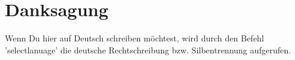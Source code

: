 \clearpage
\chapter*{\textbf{Danksagung}}\label{danksagung}

Wenn Du hier auf Deutsch schreiben möchtest, wird durch den Befehl 'selectlanuage' die deutsche Rechtschreibung bzw. Silbentrennung aufgerufen.


